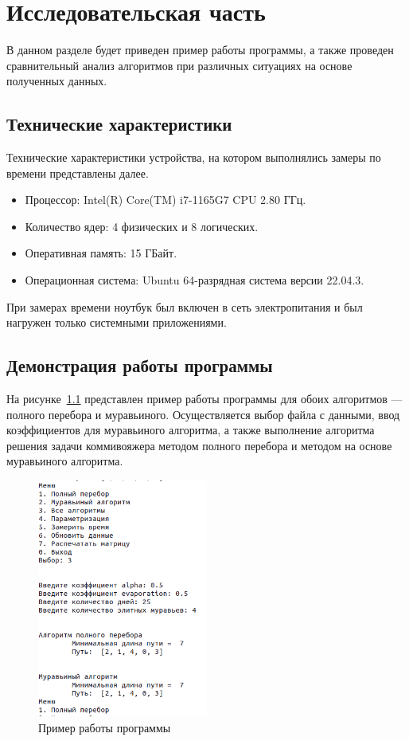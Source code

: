 \chapter{Исследовательская часть}

В данном разделе будет приведен пример работы программы, а также проведен сравнительный анализ алгоритмов при различных ситуациях на основе полученных данных.

\section{Технические характеристики}

Технические характеристики устройства, на котором выполнялись замеры по времени представлены далее.

\begin{itemize}
	\item Процессор: Intel(R) Core(TM) i7-1165G7 CPU 2.80 ГГц.
	\item Количество ядер: 4 физических и 8 логических.
	\item Оперативная память: 15 ГБайт.
	\item Операционная система: Ubuntu 64-разрядная система версии 22.04.3.
\end{itemize}

При замерах времени ноутбук был включен в сеть электропитания и был нагружен только системными приложениями.

\section{Демонстрация работы программы}

На рисунке~\ref{img:example}  представлен пример работы программы для обоих алгоритмов --- полного перебора и муравьиного.
Осуществляется выбор файла с данными, ввод коэффициентов для муравьиного алгоритма, а также выполнение алгоритма решения задачи коммивояжера методом полного перебора и методом на основе муравьиного алгоритма.

\clearpage

\begin{figure}[h]
	\centering
	\includegraphics[width=0.5\textwidth]{img/example.png}
	\caption{Пример работы программы}
	\label{img:example}
\end{figure}

